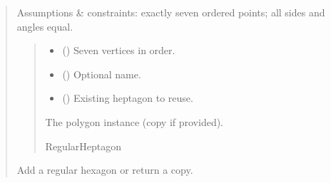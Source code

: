 \documentclass[letterpaper,10pt,english]{sphinxmanual}
\begin{document}
\begin{quote}
\begin{fulllineitems}
\begin{fulllineitems}
\sphinxAtStartPar
Assumptions \& constraints: exactly seven ordered points; all sides and
angles equal.
\begin{quote}\begin{description}
\begin{itemize}
\item {} 
\sphinxAtStartPar
{} () \textendash{} Seven vertices in order.

\item {} 
\sphinxAtStartPar
{} (\sphinxstyleliteralemphasis{\sphinxupquote{ | }}) \textendash{} Optional name.

\item {} 
\sphinxAtStartPar
{} (\sphinxstyleliteralemphasis{\sphinxupquote{ | }}) \textendash{} Existing heptagon to reuse.

\end{itemize}

\sphinxAtStartPar
The polygon instance (copy if provided).

\sphinxAtStartPar
RegularHeptagon

\end{description}\end{quote}

\end{fulllineitems}


\begin{fulllineitems}
\label{\detokenize{pygeox:pygeox.add_objects.AddNamespace.regular_hexagon}}
\pysigstartsignatures
\pysiglinewithargsret
{}
{\sphinxparamcomma {}\sphinxparamcomma {}}
{}
\pysigstopsignatures
\sphinxAtStartPar
Add a regular hexagon or return a copy.


\end{fulllineitems}
\end{fulllineitems}
\end{quote}
\end{document}
